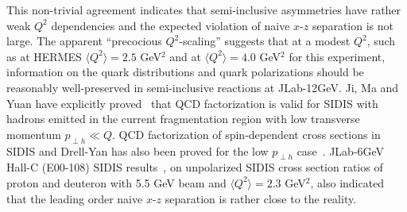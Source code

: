 This non-trivial agreement indicates that semi-inclusive asymmetries have rather weak $Q^2$ dependencies and 
the expected violation of naive \lo $x$-$z$ separation is not large.  
The apparent ``precocious $Q^2$-scaling'' suggests that at a modest $Q^2$, such as at HERMES $\langle Q^2 \rangle=2.5$ GeV$^2$ and 
at $\langle Q^2 \rangle=4.0$ GeV$^2$ for this experiment, information on the  quark distributions and quark polarizations should be reasonably  
well-preserved in semi-inclusive reactions at JLab-12GeV.   Ji, Ma and Yuan have  
explicitly proved~\cite{Ji:2004wu} that QCD factorization is valid for SIDIS with 
hadrons emitted in the current fragmentation region with low  
transverse momentum $p_{\perp h } \ll Q$.  QCD factorization of spin-dependent
cross sections in SIDIS and Drell-Yan has also been proved
 for the low $p_{\perp h }$ case~\cite{Ji:2004xq}.
JLab-6GeV  Hall-C (E00-108) SIDIS  results~\cite{Navasardyan:2006gv, Asaturyan:2011mq}, on unpolarized SIDIS cross section ratios
of proton and deuteron with 5.5 GeV beam and $\langle Q^2 \rangle=2.3$ GeV$^2$,  
also indicated that the leading order naive $x$-$z$ separation is
rather close to the reality. 


